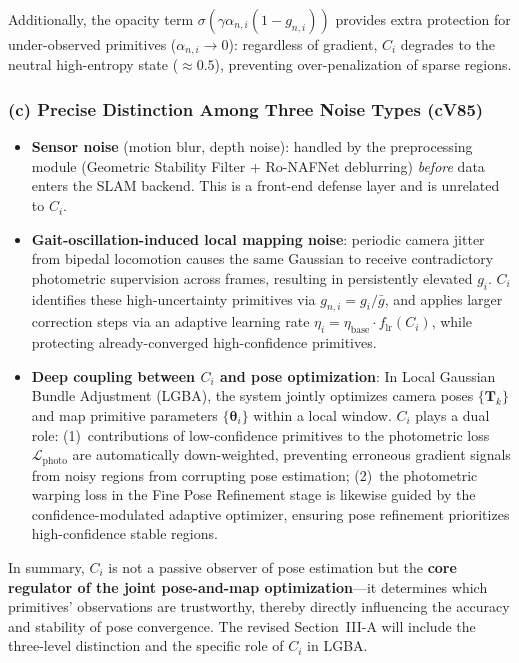 \documentclass[10pt,a4paper]{article}
\begin{document}
Additionally, the opacity term $\sigma(\gamma\alpha_{n,i}(1-g_{n,i}))$ provides extra protection for under-observed primitives ($\alpha_{n,i} \to 0$): regardless of gradient, $C_i$ degrades to the neutral high-entropy state ($\approx 0.5$), preventing over-penalization of sparse regions.

\subsubsection*{(c) Precise Distinction Among Three Noise Types (cV85)}

\begin{itemize}[leftmargin=1.8em,topsep=2pt,itemsep=2pt]
  \item \textbf{Sensor noise} (motion blur, depth noise): handled by the preprocessing module (Geometric Stability Filter + Ro-NAFNet deblurring) \emph{before} data enters the SLAM backend. This is a front-end defense layer and is unrelated to $C_i$.
  \item \textbf{Gait-oscillation-induced local mapping noise}: periodic camera jitter from bipedal locomotion causes the same Gaussian to receive contradictory photometric supervision across frames, resulting in persistently elevated $g_i$. $C_i$ identifies these high-uncertainty primitives via $g_{n,i} = g_i/\bar{g}$, and applies larger correction steps via an adaptive learning rate $\eta_i = \eta_{\text{base}}\cdot f_{\text{lr}}(C_i)$, while protecting already-converged high-confidence primitives.
  \item \textbf{Deep coupling between $C_i$ and pose optimization}: In Local Gaussian Bundle Adjustment (LGBA), the system jointly optimizes camera poses $\{\mathbf{T}_k\}$ and map primitive parameters $\{\boldsymbol{\theta}_i\}$ within a local window. $C_i$ plays a dual role: (1)~contributions of low-confidence primitives to the photometric loss $\mathcal{L}_{\text{photo}}$ are automatically down-weighted, preventing erroneous gradient signals from noisy regions from corrupting pose estimation; (2)~the photometric warping loss in the Fine Pose Refinement stage is likewise guided by the confidence-modulated adaptive optimizer, ensuring pose refinement prioritizes high-confidence stable regions.
\end{itemize}

In summary, $C_i$ is not a passive observer of pose estimation but the \textbf{core regulator of the joint pose-and-map optimization}---it determines which primitives' observations are trustworthy, thereby directly influencing the accuracy and stability of pose convergence. The revised Section~III-A will include the three-level distinction and the specific role of $C_i$ in LGBA.
\end{document}
